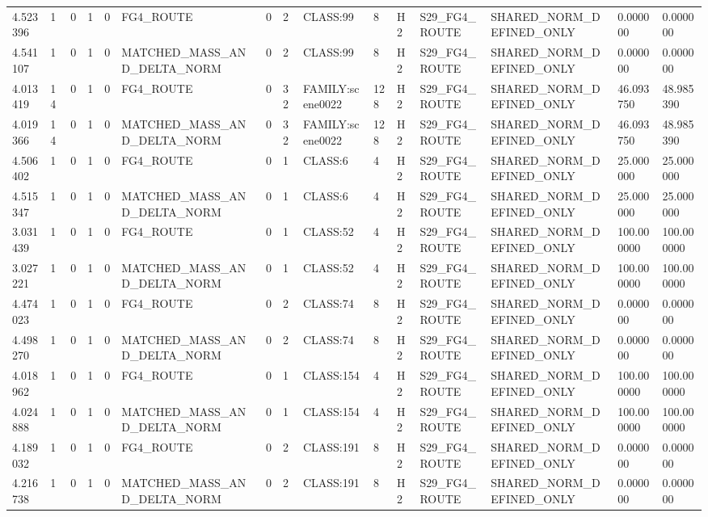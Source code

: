 \begin{tabular}{lllllllllllllll}
4.523396 & 1 & 0 & 1 & 0 & FG4\_ROUTE & 0 & 2 & CLASS:99 & 8 & H2 & S29\_FG4\_ROUTE & SHARED\_NORM\_DEFINED\_ONLY & 0.000000 & 0.000000 \\
4.541107 & 1 & 0 & 1 & 0 & MATCHED\_MASS\_AND\_DELTA\_NORM & 0 & 2 & CLASS:99 & 8 & H2 & S29\_FG4\_ROUTE & SHARED\_NORM\_DEFINED\_ONLY & 0.000000 & 0.000000 \\
4.013419 & 14 & 0 & 1 & 0 & FG4\_ROUTE & 0 & 32 & FAMILY:scene0022 & 128 & H2 & S29\_FG4\_ROUTE & SHARED\_NORM\_DEFINED\_ONLY & 46.093750 & 48.985390 \\
4.019366 & 14 & 0 & 1 & 0 & MATCHED\_MASS\_AND\_DELTA\_NORM & 0 & 32 & FAMILY:scene0022 & 128 & H2 & S29\_FG4\_ROUTE & SHARED\_NORM\_DEFINED\_ONLY & 46.093750 & 48.985390 \\
4.506402 & 1 & 0 & 1 & 0 & FG4\_ROUTE & 0 & 1 & CLASS:6 & 4 & H2 & S29\_FG4\_ROUTE & SHARED\_NORM\_DEFINED\_ONLY & 25.000000 & 25.000000 \\
4.515347 & 1 & 0 & 1 & 0 & MATCHED\_MASS\_AND\_DELTA\_NORM & 0 & 1 & CLASS:6 & 4 & H2 & S29\_FG4\_ROUTE & SHARED\_NORM\_DEFINED\_ONLY & 25.000000 & 25.000000 \\
3.031439 & 1 & 0 & 1 & 0 & FG4\_ROUTE & 0 & 1 & CLASS:52 & 4 & H2 & S29\_FG4\_ROUTE & SHARED\_NORM\_DEFINED\_ONLY & 100.000000 & 100.000000 \\
3.027221 & 1 & 0 & 1 & 0 & MATCHED\_MASS\_AND\_DELTA\_NORM & 0 & 1 & CLASS:52 & 4 & H2 & S29\_FG4\_ROUTE & SHARED\_NORM\_DEFINED\_ONLY & 100.000000 & 100.000000 \\
4.474023 & 1 & 0 & 1 & 0 & FG4\_ROUTE & 0 & 2 & CLASS:74 & 8 & H2 & S29\_FG4\_ROUTE & SHARED\_NORM\_DEFINED\_ONLY & 0.000000 & 0.000000 \\
4.498270 & 1 & 0 & 1 & 0 & MATCHED\_MASS\_AND\_DELTA\_NORM & 0 & 2 & CLASS:74 & 8 & H2 & S29\_FG4\_ROUTE & SHARED\_NORM\_DEFINED\_ONLY & 0.000000 & 0.000000 \\
4.018962 & 1 & 0 & 1 & 0 & FG4\_ROUTE & 0 & 1 & CLASS:154 & 4 & H2 & S29\_FG4\_ROUTE & SHARED\_NORM\_DEFINED\_ONLY & 100.000000 & 100.000000 \\
4.024888 & 1 & 0 & 1 & 0 & MATCHED\_MASS\_AND\_DELTA\_NORM & 0 & 1 & CLASS:154 & 4 & H2 & S29\_FG4\_ROUTE & SHARED\_NORM\_DEFINED\_ONLY & 100.000000 & 100.000000 \\
4.189032 & 1 & 0 & 1 & 0 & FG4\_ROUTE & 0 & 2 & CLASS:191 & 8 & H2 & S29\_FG4\_ROUTE & SHARED\_NORM\_DEFINED\_ONLY & 0.000000 & 0.000000 \\
4.216738 & 1 & 0 & 1 & 0 & MATCHED\_MASS\_AND\_DELTA\_NORM & 0 & 2 & CLASS:191 & 8 & H2 & S29\_FG4\_ROUTE & SHARED\_NORM\_DEFINED\_ONLY & 0.000000 & 0.000000 \\

\end{tabular}
